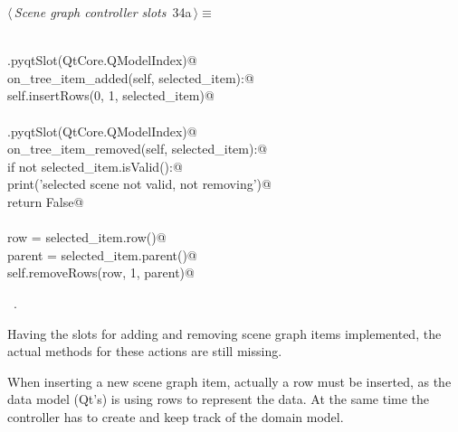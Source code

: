 \documentclass[
    a4paper,      %
    10pt,         %
    openright,    %
    notitlepage,  %
    parskip=half, %
]{scrreprt}       %
\theoremstyle{definition}                    %
\begin{document}
\begin{flushleft} \small
\begin{minipage}{\linewidth}\label{scrap37}\raggedright\small
{} $\langle\,${\itshape Scene graph controller slots}\nobreak\ {\footnotesize {34a}}$\,\rangle\equiv$
\vspace{-1ex}
\begin{list}{}{} \item
\mbox{}\lstinline@@\\
\mbox{}\lstinline@QtCore.pyqtSlot(QtCore.QModelIndex)@\\
\mbox{}\lstinline@def on_tree_item_added(self, selected_item):@\\
\mbox{}\lstinline@    self.insertRows(0, 1, selected_item)@\\
\mbox{}\lstinline@@\\
\mbox{}\lstinline@QtCore.pyqtSlot(QtCore.QModelIndex)@\\
\mbox{}\lstinline@def on_tree_item_removed(self, selected_item):@\\
\mbox{}\lstinline@    if not selected_item.isValid():@\\
\mbox{}\lstinline@        print('selected scene not valid, not removing')@\\
\mbox{}\lstinline@        return False@\\
\mbox{}\lstinline@@\\
\mbox{}\lstinline@    row = selected_item.row()@\\
\mbox{}\lstinline@    parent = selected_item.parent()@\\
\mbox{}\lstinline@    self.removeRows(row, 1, parent)@\\
\mbox{}\lstinline@@{\NWsep}
\end{list}
\vspace{-1.5ex}
\footnotesize
\begin{list}{}{\setlength{\itemsep}{-\parsep}\setlength{\itemindent}{-\leftmargin}}
\item \NWtxtMacroRefIn\ .

\item{}
\end{list}
\end{minipage}\vspace{4ex}
\end{flushleft}
Having the slots for adding and removing scene graph items implemented, the
actual methods for these actions are still missing.

When inserting a new scene graph item, actually a row must be inserted, as the
data model (Qt's) is using rows to represent the data. At the same time the
controller has to create and keep track of the domain model.
\end{document}
